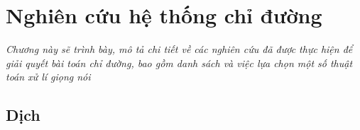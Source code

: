 \chapter{Nghiên cứu hệ thống chỉ đường}
\label{Chapter3}

\emph{Chương này sẽ trình bày, mô tả chi tiết về các nghiên cứu đã được thực hiện để giải quyết bài toán chỉ đường, bao gồm danh sách và việc lựa chọn một số thuật toán xử lí giọng nói}





\section{Dịch}


